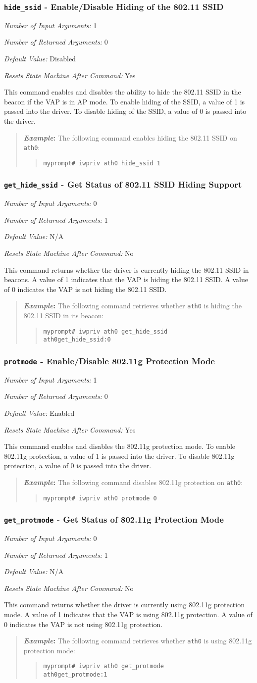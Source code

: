 \documentclass[10pt,fullpage]{article}
\newcommand{\mytt}[1]{{\texttt{#1}}}
\newcommand{\bv}{\begin{verse}}
\newcommand{\ev}{\end{verse}}
\newcommand{\cmd}[1]{{\texttt{myprompt\# #1}}}
\newcommand{\argdesc}[4]{\begin{description}
\itemsep -6pt
\item \textit{Number of Input Arguments:} #1
\item \textit{Number of Returned Arguments:} #2
\item \textit{Default Value:} #3
\item \textit{Resets State Machine After Command:} #4
\end{description}
}
\newenvironment{example}{\begin{quote}\textbf{\textit{Example}:}}{\end{quote}}
\begin{document}
\subsubsection{\mytt{hide\_ssid} - Enable/Disable Hiding of the 802.11 SSID}
\argdesc{1}{0}{Disabled}{Yes}
This command enables and disables the ability to hide the 802.11 SSID
in the beacon if the VAP is in AP mode.  To enable hiding of the SSID,
a value of 1 is passed into the driver. To disable hiding of the SSID,
a value of 0 is passed into the driver.
\begin{example}
  The following command enables hiding the 802.11 SSID on \mytt{ath0}:
  \bv
  \cmd{iwpriv ath0 hide\_ssid 1}
  \ev
\end{example}

\subsubsection{\mytt{get\_hide\_ssid} - Get Status of 802.11 SSID
  Hiding Support}
\argdesc{0}{1}{N/A}{No}
This command returns whether the driver is currently hiding the 802.11
SSID in beacons.  A value of 1 indicates that the VAP is hiding the
802.11 SSID.  A value of 0 indicates the VAP is not hiding the 802.11
SSID.
\begin{example}
  The following command retrieves whether \mytt{ath0} is hiding the
  802.11 SSID in its beacon:
  \bv
  \cmd{iwpriv ath0 get\_hide\_ssid}\\
  \mytt{ath0\hspace{32pt}get\_hide\_ssid:0}
  \ev
\end{example}

\subsubsection{\mytt{protmode} - Enable/Disable 802.11g Protection Mode}
\argdesc{1}{0}{Enabled}{Yes}
This command enables and disables the 802.11g protection mode.  To
enable 802.11g protection, a value of 1 is passed into the driver. To
disable 802.11g protection, a value of 0 is passed into the driver.
\begin{example}
  The following command disables 802.11g protection on \mytt{ath0}:
  \bv
  \cmd{iwpriv ath0 protmode 0}
  \ev
\end{example}

\subsubsection{\mytt{get\_protmode} - Get Status of 802.11g Protection
  Mode}
\argdesc{0}{1}{N/A}{No}
This command returns whether the driver is currently using 802.11g
protection mode. A value of 1 indicates that the VAP is using 802.11g
protection.  A value of 0 indicates the VAP is not using 802.11g
protection.
\begin{example}
  The following command retrieves whether \mytt{ath0} is using 802.11g
  protection mode:
  \bv
  \cmd{iwpriv ath0 get\_protmode}\\
  \mytt{ath0\hspace{32pt}get\_protmode:1}
  \ev
\end{example}
\end{document}
